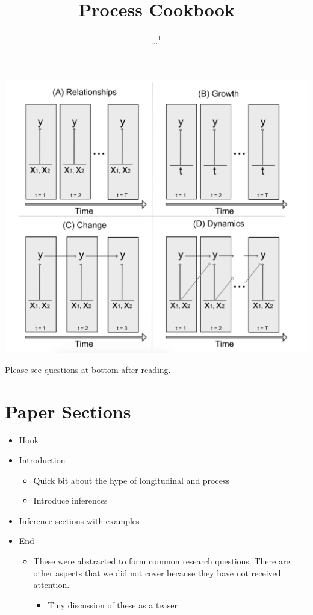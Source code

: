 \documentclass[english,,man]{apa6}
\title{Process Cookbook}
\author{\ldots{}\textsuperscript{1}}
\date{}
\affiliation{
\vspace{0.5cm}
\textsuperscript{1} ...}
\providecommand{\tightlist}{%
  \setlength{\itemsep}{0pt}\setlength{\parskip}{0pt}}
\theoremstyle{definition}
\theoremstyle{definition}
\theoremstyle{definition}
\theoremstyle{remark}
\begin{document}
\maketitle

\includegraphics{figures/common_models.png}

Please see questions at bottom after reading.

\hypertarget{paper-sections}{%
\section{Paper Sections}\label{paper-sections}}

\begin{itemize}
\tightlist
\item
  Hook
\item
  Introduction

  \begin{itemize}
  \tightlist
  \item
    Quick bit about the hype of longitudinal and process
  \item
    Introduce inferences
  \end{itemize}
\item
  Inference sections with examples
\item
  End

  \begin{itemize}
  \tightlist
  \item
    These were abstracted to form common research questions. There are
    other aspects that we did not cover because they have not received
    attention.

    \begin{itemize}
    \tightlist
    \item
      Tiny discussion of these as a teaser
    \end{itemize}
  \end{itemize}
\end{itemize}
\end{document}
